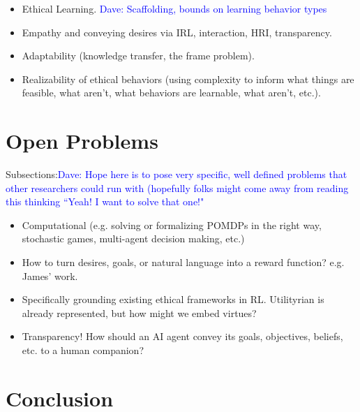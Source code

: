 \documentclass[11pt]{article}
\newcommand\davenote[1]{\textcolor{blue}{Dave: #1}}
\begin{document}
\begin{itemize}
\item Ethical Learning. \davenote{Scaffolding, bounds on learning behavior types}
\item Empathy and conveying desires via IRL, interaction, HRI, transparency.
\item Adaptability (knowledge transfer, the frame problem).
\item Realizability of ethical behaviors (using complexity to inform what things are feasible, what aren't, what behaviors are learnable, what aren't, etc.).
\end{itemize}


\section{Open Problems}

Subsections:\davenote{Hope here is to pose very specific, well defined problems that other researchers could run with (hopefully folks might come away from reading this thinking ``Yeah! I want to solve that one!"}
\begin{itemize}
\item Computational (e.g. solving or formalizing POMDPs in the right way, stochastic games, multi-agent decision making, etc.)
\item How to turn desires, goals, or natural language into a reward function? e.g. James' work.
\item Specifically grounding existing ethical frameworks in RL. Utilityrian is already represented, but how might we embed virtues?
\item Transparency! How should an AI agent convey its goals, objectives, beliefs, etc. to a human companion?
\end{itemize}


\section{Conclusion}




\end{document}
